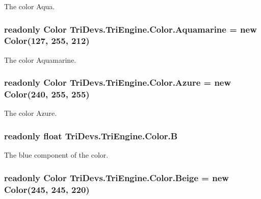 The color Aqua. 

\hypertarget{struct_tri_devs_1_1_tri_engine_1_1_color_af54538bbc650d0c3b6f10b434a28a6ed}{
\subsubsection[{Aquamarine}]{\setlength{\rightskip}{0pt plus 5cm}readonly {\bf Color} Tri\-Devs.\-Tri\-Engine.\-Color.\-Aquamarine = new {\bf Color}(127, 255, 212)\hspace{0.3cm}{\ttfamily [static]}}}\label{struct_tri_devs_1_1_tri_engine_1_1_color_af54538bbc650d0c3b6f10b434a28a6ed}


The color Aquamarine. 

\hypertarget{struct_tri_devs_1_1_tri_engine_1_1_color_a7adf069c5dc847a4abeafdd826062974}{
\subsubsection[{Azure}]{\setlength{\rightskip}{0pt plus 5cm}readonly {\bf Color} Tri\-Devs.\-Tri\-Engine.\-Color.\-Azure = new {\bf Color}(240, 255, 255)\hspace{0.3cm}{\ttfamily [static]}}}\label{struct_tri_devs_1_1_tri_engine_1_1_color_a7adf069c5dc847a4abeafdd826062974}


The color Azure. 

\hypertarget{struct_tri_devs_1_1_tri_engine_1_1_color_a83c0cf98d6809a4c38e8759f268dc894}{
\subsubsection[{B}]{\setlength{\rightskip}{0pt plus 5cm}readonly float Tri\-Devs.\-Tri\-Engine.\-Color.\-B}}\label{struct_tri_devs_1_1_tri_engine_1_1_color_a83c0cf98d6809a4c38e8759f268dc894}


The blue component of the color. 

\hypertarget{struct_tri_devs_1_1_tri_engine_1_1_color_a483cb936d847618fbb1daea09852d299}{
\subsubsection[{Beige}]{\setlength{\rightskip}{0pt plus 5cm}readonly {\bf Color} Tri\-Devs.\-Tri\-Engine.\-Color.\-Beige = new {\bf Color}(245, 245, 220)\hspace{0.3cm}{\ttfamily [static]}}}\label{struct_tri_devs_1_1_tri_engine_1_1_color_a483cb936d847618fbb1daea09852d299}


